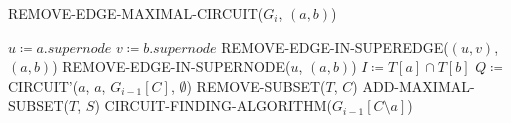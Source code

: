 \begin{algorithm}[H]
    \caption{REMOVE-EDGE-MAXIMAL-CIRCUIT($G_i$, $(a, b)$)}\label{alg:remove-edge-maximal-circuit}
    \begin{algorithmic}[1]
        \State $u \coloneqq a.supernode$
        \State $v \coloneqq b.supernode$
            \State REMOVE-EDGE-IN-SUPEREDGE($(u, v)$, $(a, b)$)
        \Else
            \State REMOVE-EDGE-IN-SUPERNODE($u$, $(a, b)$)
        \EndIf
        \State $I \coloneqq T[a] \cap T[b]$
            \State $Q \coloneqq $ CIRCUIT'($a$, $a$, $G_{i-1}[C]$, $\emptyset$)
                \State REMOVE-SUBSET($T$, $C$)
                    \State ADD-MAXIMAL-SUBSET($T$, $S$)
                \EndFor
                \State CIRCUIT-FINDING-ALGORITHM($G_{i-1}[C\setminus{a}]$)
            \EndIf
        \EndFor
    \end{algorithmic}
\end{algorithm}